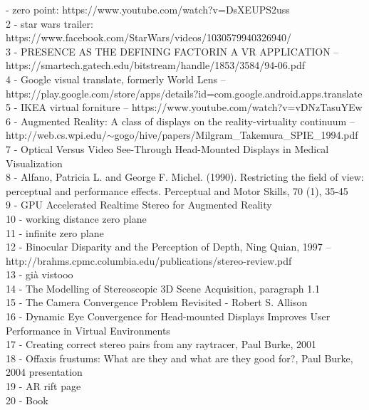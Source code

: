 \fi
{} - zero point: https://www.youtube.com/watch?v=DsXEUPS2uss \\ 
2 - star wars trailer: https://www.facebook.com/StarWars/videos/1030579940326940/ \\
3 - PRESENCE AS THE DEFINING FACTORIN A VR APPLICATION -- \\ https://smartech.gatech.edu/bitstream/handle/1853/3584/94-06.pdf \\ 
4 - Google visual translate, formerly World Lens -- \\ https://play.google.com/store/apps/details?id=com.google.android.apps.translate \\
5 - IKEA virtual forniture -- https://www.youtube.com/watch?v=vDNzTasuYEw \\
6 - Augmented Reality: A class of displays on the reality-virtuality continuum -- \\ http://web.cs.wpi.edu/$\sim$gogo/hive/papers/Milgram\_Takemura\_SPIE\_1994.pdf \\
7 - Optical Versus Video See-Through Head-Mounted Displays in Medical Visualization \\
8 - Alfano, Patricia L. and George F. Michel. (1990). Restricting the field of view: perceptual and performance effects. Perceptual and Motor Skills, 70 (1), 35-45 \\
9 - GPU Accelerated Realtime Stereo for Augmented Reality \\
10 - working distance zero plane \\
11 - infinite zero plane \\
12 - Binocular Disparity and the Perception of Depth, Ning Quian, 1997 -- \\ http://brahms.cpmc.columbia.edu/publications/stereo-review.pdf \\
13 - già vistooo \\
14 - The Modelling of Stereoscopic 3D Scene Acquisition, paragraph 1.1 \\ 
15 - The Camera Convergence Problem Revisited - Robert S. Allison \\ 
16 - Dynamic Eye Convergence for Head-mounted Displays Improves User Performance in Virtual Environments \\
17 - Creating correct stereo pairs from any raytracer, Paul Burke, 2001 \\
18 - Offaxis frustums: What are they and what are they good for?, Paul Burke, 2004 presentation \\
19 - AR rift page \\
20 - Book \\
